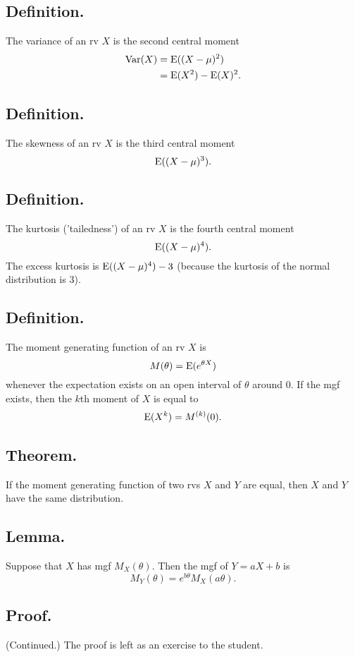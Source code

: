 \documentclass[titlepage]{article}
\begin{document}
\subsection{Definition.} The variance of an rv $X$ is the second central moment 
\begin{align*}
    \text{Var}(X) &= \text{E}((X-\mu)^{2}) \\
            &= \text{E}(X^{2}) - \text{E}(X)^{2}.
\end{align*}

\subsection{Definition.} The skewness of an rv $X$ is the third central moment 
$$\text{E}((X-\mu)^{3}).$$

\subsection{Definition.} The kurtosis ('tailedness') of an rv $X$ is the fourth central moment 
$$\text{E}((X-\mu)^{4}).$$
The excess kurtosis is $\text{E}((X-\mu)^{4}) - 3$ (because the kurtosis of the normal distribution is $3$).

\subsection{Definition.} The moment generating function of an rv $X$ is 
$$M(\theta) = \text{E}(e^{\theta X})$$
whenever the expectation exists on an open interval of $\theta$ around $0$. If the mgf exists, then the $k$th moment of $X$ is equal to 
$$\text{E}(X^{k}) = M^{(k)}(0).$$

\subsection{Theorem.} If the moment generating function of two rvs $X$ and $Y$ are equal, then $X$ and $Y$ have the same distribution.

\subsection{Lemma.} Suppose that $X$ has mgf $M_{X}(\theta)$. Then the mgf of $Y = aX + b$ is
$$M_{Y}(\theta) = e^{b\theta}M_{X}(a\theta).$$

\subsection{Proof.} (Continued.) The proof is left as an exercise to the student.
\end{document}

